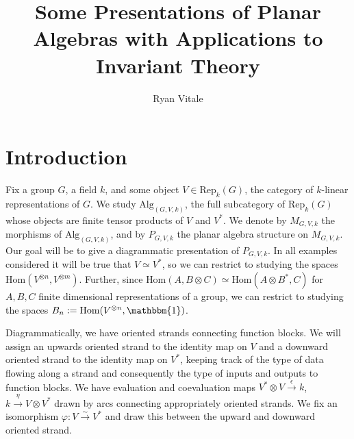 \documentclass[11pt]{article} %
\title{Some Presentations of Planar Algebras with Applications to Invariant Theory}
\author{Ryan Vitale}
\begin{document}
\newtheorem{mydef}{Definition}
\newtheorem{prop}{Proposition}
\newtheorem{lemma}{Lemma}

\maketitle

\section{Introduction}

Fix a group $G$, a field $k$, and some object $V\in \text{Rep}_k(G)$, the category of $k$-linear representations of $G$. We study $\text{Alg}_{(G,V,k)}$, the full subcategory of $\text{Rep}_k(G)$ whose objects are finite tensor products of $V$ and $V^{\ast}$. We denote by $M_{G,V,k}$ the morphisms of $\text{Alg}_{(G,V,k)}$, and by $P_{G,V,k}$ the planar algebra structure on $M_{G,V,k}$. Our goal will be to give a diagrammatic presentation of $P_{G,V,k}$. In all examples considered it will be true that $V \simeq V^{\ast}$, so we can restrict to studying the spaces $\text{Hom}(V^{\otimes n},V^{\otimes m})$. Further, since $\text{Hom}(A, B \otimes C) \simeq \text{Hom}(A\otimes B^{\ast},C)$ for $A,B,C$ finite dimensional representations of a group, we can restrict to studying the spaces $B_n := \text{Hom}(V^{\otimes n}, \mathbbm{1})$.

Diagrammatically, we have oriented strands connecting function blocks. We will assign an upwards oriented strand to the identity map on $V$ and a downward oriented strand to the identity map on $V^{\ast}$, keeping track of the type of data flowing along a strand and consequently the type of inputs and outputs to function blocks. We have evaluation and coevaluation maps $V^{\ast} \otimes V \xrightarrow{\epsilon} k$, $k \xrightarrow{\eta} V \otimes V^{\ast}$ drawn by arcs connecting appropriately oriented strands. We fix an isomorphism $\varphi:V \xrightarrow{\sim} V^{\ast}$ and draw this between the upward and downward oriented strand.
\end{document}
